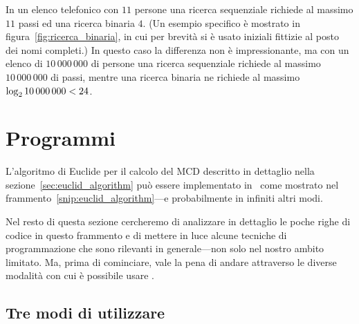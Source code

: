 \begin{figure}[htb!]
\end{figure}

\begin{examplebox}
  \begin{example}
    In un elenco telefonico con $11$ persone una ricerca sequenziale richiede
    al massimo $11$ passi ed una ricerca binaria $4$. (Un esempio specifico
    è mostrato in figura~\ref{fig:ricerca_binaria}, in cui per brevità
    si è usato iniziali fittizie al posto dei nomi completi.) In questo caso
    la differenza non è impressionante, ma con un elenco di $10\,000\,000$
    di persone una ricerca sequenziale richiede al massimo $10\,000\,000$ di
    passi, mentre una ricerca binaria ne richiede al massimo
    $\llog[2]{10\,000\,000} < 24$.
  \end{example}
\end{examplebox}


\section{Programmi}
\label{sec:programmi}

L'algoritmo di Euclide per il calcolo del MCD descritto in dettaglio nella
sezione~\ref{sec:euclid_algorithm} pu\`o essere implementato in \python\ come mostrato
nel frammento~\ref{snip:euclid_algorithm}---e probabilmente in infiniti altri modi.


Nel resto di questa sezione cercheremo di analizzare in dettaglio le poche righe di
codice in questo frammento e di mettere in luce alcune tecniche di programmazione
che sono rilevanti in generale---non solo nel nostro ambito limitato.
Ma, prima di cominciare, vale la pena di andare attraverso le diverse modalit\`a
con cui \`e possibile usare \python.


\subsection{Tre modi di utilizzare \python}
\label{sec:python_usage}

